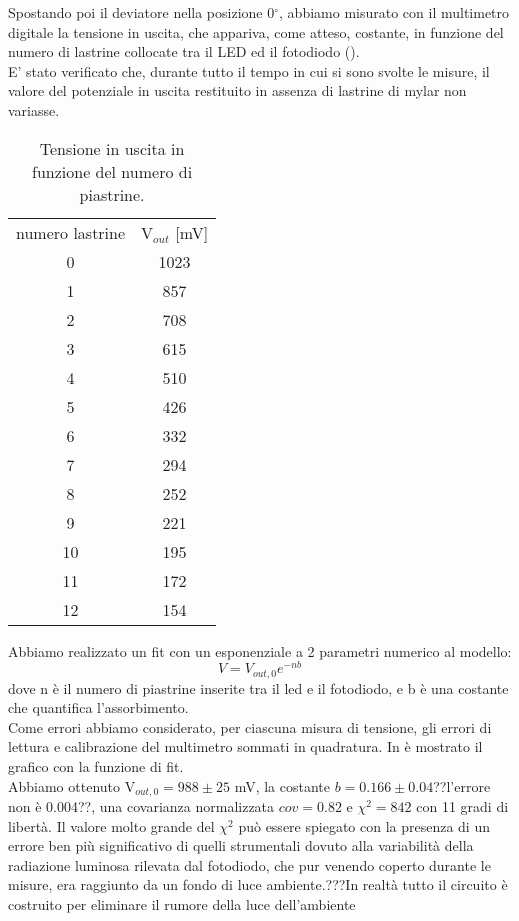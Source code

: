  Spostando poi il deviatore nella posizione 0$^\circ$, abbiamo misurato con il multimetro digitale la tensione in uscita, che appariva, come atteso, costante, in funzione del numero di lastrine collocate tra il LED ed il fotodiodo ().\\ E' stato verificato che, durante tutto il tempo in cui si sono svolte le misure, il valore del potenziale in uscita restituito in assenza di lastrine di mylar non variasse. 
\begin{table}[h]
	\centering
	\begin{tabular}{cc}		
		{numero lastrine} & {V$_{out}$ [mV]}\\
                      0 & 1023\\
                      1 & 857\\
                      2 & 708\\
                      3 & 615\\
                      4 & 510\\
                      5 & 426\\
                      6 & 332\\
                      7 & 294\\
                      8 & 252\\
                      9 & 221\\
                     10 & 195\\
                     11 & 172\\
                     12 & 154\\
	           \midrule
	
 	\end{tabular}
	\caption{Tensione in uscita in funzione del numero di piastrine. }
	\label{t:Fotodiodo}
\end{table}
Abbiamo realizzato un fit con un esponenziale a 2 parametri numerico al modello:
\begin{equation}
V=V_{out,0}e^{-nb}
\end{equation}
dove n è il numero di piastrine inserite tra il led e il fotodiodo, e b è una costante che quantifica l'assorbimento.\\
 Come errori abbiamo considerato, per ciascuna misura di tensione, gli errori di lettura e calibrazione del multimetro sommati in quadratura. In  è mostrato il grafico con la funzione di fit.\\
Abbiamo ottenuto V$_{out,0} = 988 \pm 25$ mV, la costante $b = 0.166 \pm 0.04$??l'errore non è 0.004??, una covarianza normalizzata $cov = 0.82$ e $\chi^2 = 842$ con 11 gradi di libertà. Il valore molto grande del $\chi^2$ può essere spiegato con la presenza di un errore ben più significativo di quelli strumentali dovuto alla variabilità della radiazione luminosa rilevata dal fotodiodo, che pur venendo coperto durante le misure, era raggiunto da un fondo di luce ambiente.???In realtà tutto il circuito è costruito per eliminare il rumore della luce dell'ambiente\\
